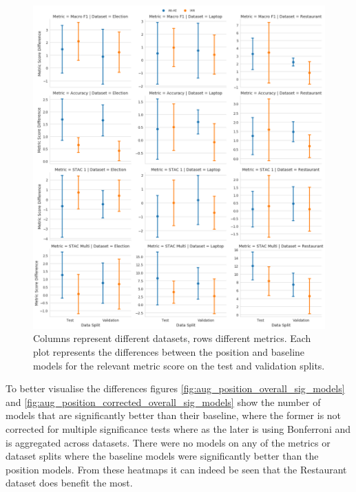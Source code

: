 
\begin{figure}[h!]
    \centering
    \includegraphics[scale=0.32]{images/augmentation/methods_performance/Position_Encoding/position_baseline_overall_differences.png}
    \caption{Columns represent different datasets, rows different metrics. Each plot represents the differences between the position and baseline models for the relevant metric score on the test and validation splits.}
    \label{fig:aug_position_baseline_overall_differences}
\end{figure}

To better visualise the differences figures \ref{fig:aug_position_overall_sig_models} and \ref{fig:aug_position_corrected_overall_sig_models} show the number of models that are significantly better than their baseline, where the former is not corrected for multiple significance tests where as the later is using Bonferroni and is aggregated across datasets. There were no models on any of the metrics or dataset splits where the baseline models were significantly better than the position models. From these heatmaps it can indeed be seen that the Restaurant dataset does benefit the most.%

